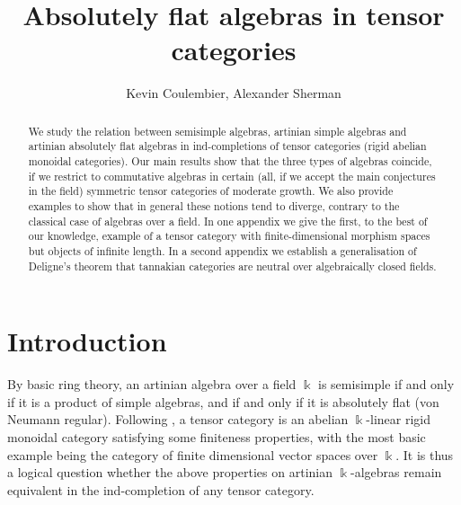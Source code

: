 \documentclass[11pt]{amsart}
\def\bk{\Bbbk}
\theoremstyle{definition}
\theoremstyle{remark}
\numberwithin{equation}{section}
\begin{document}
\title{Absolutely flat algebras in tensor categories}
		\author{Kevin Coulembier, Alexander Sherman}

        \subjclass[2020]{}

	\begin{abstract}
		We study the relation between semisimple algebras, artinian simple algebras and artinian absolutely flat algebras in ind-completions of tensor categories (rigid abelian monoidal categories). Our main results show that the three types of algebras coincide, if we restrict to commutative algebras in certain (all, if we accept the main conjectures in the field) symmetric tensor categories of moderate growth. We also provide examples to show that in general these notions tend to diverge, contrary to the classical case of algebras over a field. In one appendix we give the first, to the best of our knowledge, example of a tensor category with finite-dimensional morphism spaces but objects of infinite length. In a second appendix we establish a generalisation of Deligne's theorem that tannakian categories are neutral over algebraically closed fields.
	\end{abstract}
	
	
	\maketitle
	\pagestyle{plain}
\section{Introduction}
By basic ring theory, an artinian algebra over a field $\Bbbk$ is semisimple if and only if it is a product of simple algebras, and if and only if it is absolutely flat (von Neumann regular). 
Following \cite{EGNO}, a tensor category is an abelian $\bk$-linear rigid monoidal category satisfying some finiteness properties, with the most basic example being the category of finite dimensional vector spaces over $\bk$.  It is thus a logical question whether the above properties on artinian $\Bbbk$-algebras remain equivalent in the ind-completion of any tensor category.
\end{document}
